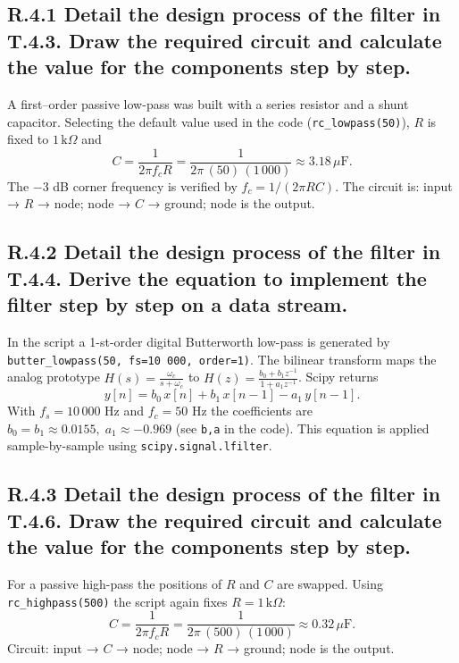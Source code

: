 \documentclass{article}
\begin{document}
\subsection*{R.4.1 Detail the design process of the filter in T.4.3. Draw the required circuit and calculate the value for the components step by step.}

A first–order passive low-pass was built with a series resistor and a shunt capacitor.  
Selecting the default value used in the code (\texttt{rc\_lowpass(50)}), $R$ is fixed to $1\,\mathrm{k}\Omega$ and  
\[
C=\frac{1}{2\pi f_c R}=\frac{1}{2\pi\,(50)\,(1\,000)}\approx 3.18\,\mu\mathrm{F}.
\]
The −3 dB corner frequency is verified by $f_c = 1/(2\pi RC)$.  
The circuit is: input → $R$ → node; node → $C$ → ground; node is the output.

\subsection*{R.4.2 Detail the design process of the filter in T.4.4. Derive the equation to implement the filter step by step on a data stream.}

In the script a 1-st-order digital Butterworth low-pass is generated by  
\texttt{butter\_lowpass(50, fs=10\,000, order=1)}.  
The bilinear transform maps the analog prototype \( H(s)=\frac{\omega_c}{s+\omega_c} \) to  
\( H(z)=\frac{b_0+b_1z^{-1}}{1+a_1z^{-1}} \).  
Scipy returns
\[ y[n]=b_0\,x[n]+b_1\,x[n-1]-a_1\,y[n-1]. \]
With \(f_s=10\,000\) Hz and \(f_c=50\) Hz the coefficients are
\( b_0=b_1\approx0.0155,\; a_1\approx-0.969 \) (see \texttt{b,a} in the code).
This equation is applied sample-by-sample using \texttt{scipy.signal.lfilter}.

\subsection*{R.4.3 Detail the design process of the filter in T.4.6. Draw the required circuit and calculate the value for the components step by step.}

For a passive high-pass the positions of $R$ and $C$ are swapped.  
Using \texttt{rc\_highpass(500)} the script again fixes $R=1\,\mathrm{k}\Omega$:  
\[
C=\frac{1}{2\pi f_c R}=\frac{1}{2\pi\,(500)\,(1\,000)}\approx 0.32\,\mu\mathrm{F}.
\]
Circuit: input → $C$ → node; node → $R$ → ground; node is the output.
\end{document}
